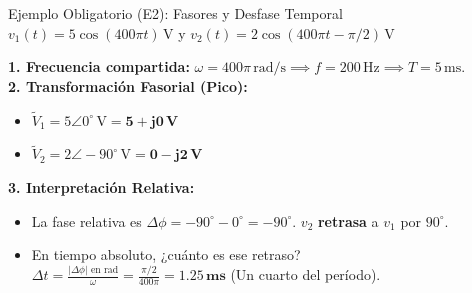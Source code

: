 \documentclass[aspectratio=169, 10pt]{beamer}
\begin{document}
\begin{frame}{Ejemplo Obligatorio (E2): Fasores y Desfase Temporal}
    $v_1(t) = 5\cos(400\pi t)\,\text{V}$ \quad y \quad $v_2(t) = 2\cos(400\pi t - \pi/2)\,\text{V}$
    
    \vspace{0.2cm}
    \textbf{1. Frecuencia compartida:} $\omega = 400\pi\,\text{rad/s} \implies f = 200\,\text{Hz} \implies T = 5\,\text{ms}$. \\
    \textbf{2. Transformación Fasorial (Pico):}
    \begin{itemize}
        \item $\tilde{V}_1 = 5 \angle 0^\circ\,\text{V} = \mathbf{5 + j0\,\text{V}}$
        \item $\tilde{V}_2 = 2 \angle -90^\circ\,\text{V} = \mathbf{0 - j2\,\text{V}}$
    \end{itemize}
    \textbf{3. Interpretación Relativa:}
    \begin{itemize}
        \item La fase relativa es $\Delta\phi = -90^\circ - 0^\circ = -90^\circ$. $v_2$ \textbf{retrasa} a $v_1$ por $90^\circ$.
        \item En tiempo absoluto, ¿cuánto es ese retraso? \\
        $\Delta t = \frac{|\Delta\phi|\text{ en rad}}{\omega} = \frac{\pi/2}{400\pi} = \mathbf{1.25\,\text{ms}}$ (Un cuarto del período).
    \end{itemize}
\end{frame}
\end{document}

